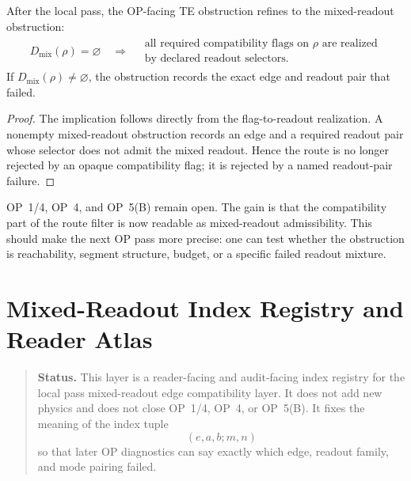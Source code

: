 \begin{theorem}
\label{thm:v410r18-mixed-readout-reduction}
After the local pass, the OP-facing TE obstruction refines to the mixed-readout
obstruction:
\[
\begin{gathered}
D_{\mathrm{mix}}(\rho)=\varnothing\quad\Longrightarrow\quad
\begin{array}{c}
\text{all required compatibility flags on }\rho\text{ are realized}\\
\text{by declared readout selectors.}
\end{array}
\end{gathered}
\]
If \(D_{\mathrm{mix}}(\rho)\neq\varnothing\), the obstruction records the exact
edge and readout pair that failed.
\end{theorem}

\begin{proof}
The implication follows directly from the flag-to-readout realization. A
nonempty mixed-readout obstruction records an edge and a required readout pair
whose selector does not admit the mixed readout. Hence the route is no longer
rejected by an opaque compatibility flag; it is rejected by a named readout-pair
failure.
\end{proof}

\begin{remark}
\label{rem:v410r18-op-status}
OP~1/4, OP~4, and OP~5(B) remain open. The gain is that the compatibility part
of the route filter is now readable as mixed-readout admissibility. This should
make the next OP pass more precise: one can test whether the obstruction is
reachability, segment structure, budget, or a specific failed readout mixture.
\end{remark}



\clearpage
\section{Mixed-Readout Index Registry and Reader Atlas}
\label{sec:v410r19-mixed-readout-index-registry}

\begin{quote}\small
\noindent\textbf{Status.}
This layer is a reader-facing and audit-facing index registry for the local pass
mixed-readout edge compatibility layer. It does not add new physics and does
not close OP~1/4, OP~4, or OP~5(B). It fixes the meaning of the index tuple
\[
 (e,a,b;m,n)
\]
so that later OP diagnostics can say exactly which edge, readout family, and
mode pairing failed.
\end{quote}

